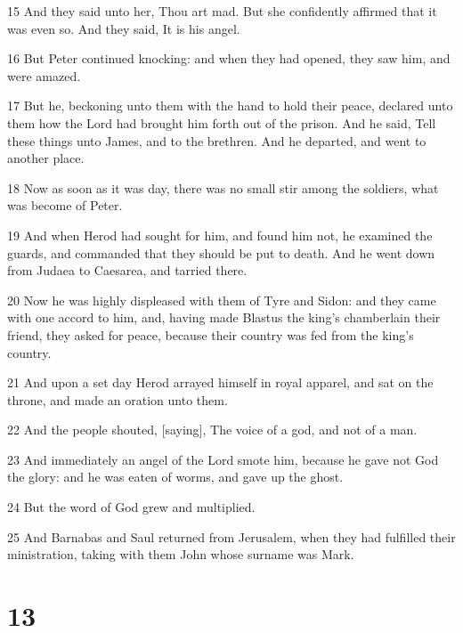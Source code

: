 \par 15 And they said unto her, Thou art mad. But she confidently affirmed that it was even so. And they said, It is his angel.
\par 16 But Peter continued knocking: and when they had opened, they saw him, and were amazed.
\par 17 But he, beckoning unto them with the hand to hold their peace, declared unto them how the Lord had brought him forth out of the prison. And he said, Tell these things unto James, and to the brethren. And he departed, and went to another place.
\par 18 Now as soon as it was day, there was no small stir among the soldiers, what was become of Peter.
\par 19 And when Herod had sought for him, and found him not, he examined the guards, and commanded that they should be put to death. And he went down from Judaea to Caesarea, and tarried there.
\par 20 Now he was highly displeased with them of Tyre and Sidon: and they came with one accord to him, and, having made Blastus the king's chamberlain their friend, they asked for peace, because their country was fed from the king's country.
\par 21 And upon a set day Herod arrayed himself in royal apparel, and sat on the throne, and made an oration unto them.
\par 22 And the people shouted, [saying], The voice of a god, and not of a man.
\par 23 And immediately an angel of the Lord smote him, because he gave not God the glory: and he was eaten of worms, and gave up the ghost.
\par 24 But the word of God grew and multiplied.
\par 25 And Barnabas and Saul returned from Jerusalem, when they had fulfilled their ministration, taking with them John whose surname was Mark.

\chapter{13}

